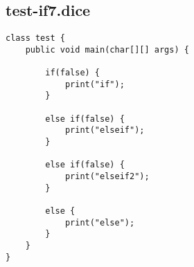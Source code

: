 \subsection{test-if7.dice}
\begin{verbatim}
class test {
	public void main(char[][] args) {

		if(false) { 
			print("if");
		} 
		
		else if(false) { 
			print("elseif"); 
		}

		else if(false) {
			print("elseif2");
		}

		else {
			print("else");
		}
	}
}
\end{verbatim}
